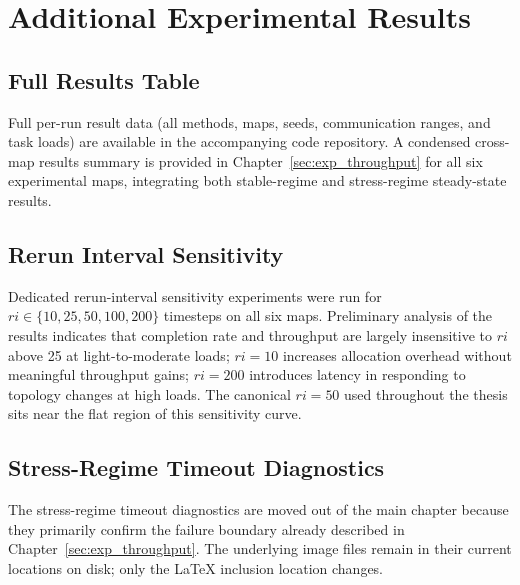 \chapter{Additional Experimental Results}
\label{app:additional_results}



\section{Full Results Table}
\label{app:full_table}

Full per-run result data (all methods, maps, seeds, communication ranges,
and task loads) are available in the accompanying code repository.
A condensed cross-map results summary is provided in Chapter~\ref{sec:exp_throughput}
for all six experimental maps, integrating both stable-regime and stress-regime
steady-state results.


\section{Rerun Interval Sensitivity}
\label{app:ri_sensitivity}

Dedicated rerun-interval sensitivity experiments were run for
$ri \in \{10, 25, 50, 100, 200\}$ timesteps on all six maps.
Preliminary analysis of the results indicates that completion rate
and throughput are largely insensitive to $ri$ above 25 at
light-to-moderate loads; $ri = 10$ increases allocation overhead without
meaningful throughput gains; $ri = 200$ introduces latency in responding
to topology changes at high loads.
The canonical $ri = 50$ used throughout the thesis sits near the
flat region of this sensitivity curve.


\section{Stress-Regime Timeout Diagnostics}
\label{app:stress_timeout_diagnostics}

The stress-regime timeout diagnostics are moved out of the main chapter
because they primarily confirm the failure boundary already described in
Chapter~\ref{sec:exp_throughput}. The underlying image files remain in their
current locations on disk; only the LaTeX inclusion location changes.

